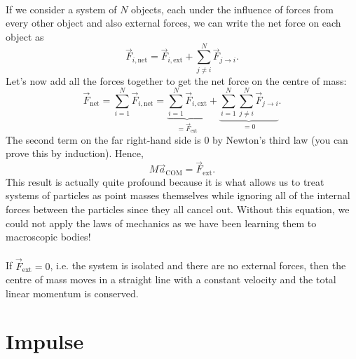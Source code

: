 \documentclass[../newtonian_mechanics.tex]{subfiles}
\begin{document}
        \paragraph{}
        If we consider a system of $N$ objects, each under the influence of forces from every other object and also external forces, we can write the net force on each object as
        \begin{equation}
            \vec{F}_{i,\text{net}}=\vec{F}_{i,\text{ext}}+\sum_{j\neq i}^N\vec{F}_{j\to i}.
        \end{equation}
        Let's now add all the forces together to get the net force on the centre of mass:
        \begin{equation}
            \vec{F}_\text{net} = \sum_{i=1}^N\vec{F}_{i,\text{net}} = \underbrace{\sum_{i=1}^N\vec{F}_{i,\text{ext}}}_{=\vec{F}_\text{ext}}+\underbrace{\sum_{i=1}^N\sum_{j\neq i}^N\vec{F}_{j\to i}}_{=0}.
        \end{equation}
        The second term on the far right-hand side is 0 by Newton's third law (you can prove this by induction).
        Hence,
        \begin{equation}\label{eq-NII-macroscopic}
            M\vec{a}_\text{COM}=\vec{F}_\text{ext}.
        \end{equation}
        This result is actually quite profound because it is what allows us to treat systems of particles as point masses themselves while ignoring all of the internal forces between the particles since they all cancel out.
        Without this equation, we could not apply the laws of mechanics as we have been learning them to macroscopic bodies!
        
        \paragraph{}
        If $\vec{F}_\text{ext}=0$, i.e. the system is isolated and there are no external forces, then the centre of mass moves in a straight line with a constant velocity and the total linear momentum is conserved.

    \section{Impulse}
\end{document}
